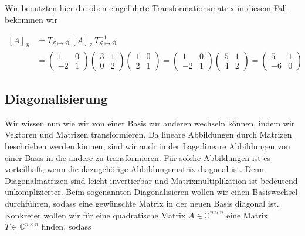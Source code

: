 \vspace{1\baselineskip}

Wir benutzten hier die oben eingeführte Transformationsmatrix in diesem Fall bekommen wir

\begin{equation*}
    \begin{aligned}
        [A]_\mathcal{B} &= T_{\mathcal{S} \mapsto \mathcal{B}} \ [A]_\mathcal{S} \ T_{\mathcal{S} \mapsto \mathcal{B}}^{-1} \\[1em]
        &= \begin{pmatrix} 1 & 0 \\ -2 & 1 \end{pmatrix} \begin{pmatrix} 3 & 1 \\ 0 & 2 \end{pmatrix} \begin{pmatrix} 1 & 0 \\ 2 & 1 \end{pmatrix} = \begin{pmatrix} 1 & 0 \\ -2 & 1 \end{pmatrix} \begin{pmatrix} 5 & 1 \\ 4 & 2 \end{pmatrix} = \begin{pmatrix} 5 & 1 \\ -6 & 0 \end{pmatrix}
    \end{aligned}
\end{equation*}

\subsection{Diagonalisierung}

Wir wissen nun wie wir von einer Basis zur anderen wechseln können, indem wir Vektoren und Matrizen transformieren. Da lineare Abbildungen durch Matrizen beschrieben werden können, sind wir auch in der Lage lineare Abbildungen von einer Basis in die andere zu transformieren. Für solche Abbildungen ist es vorteilhaft, wenn die dazugehörige Abbildungsmatrix diagonal ist. Denn Diagonalmatrizen sind leicht invertierbar und Matrixmultiplikation ist bedeutend unkomplizierter. Beim sogenannten Diagonalisieren wollen wir einen Basiswechsel durchführen, sodass eine gewünschte Matrix in der neuen Basis diagonal ist. Konkreter wollen wir für eine quadratische Matrix \( A \in \mathbb{C}^{n \times n} \) eine Matrix \( T \in \mathbb{C}^{n \times n} \) finden, sodass

